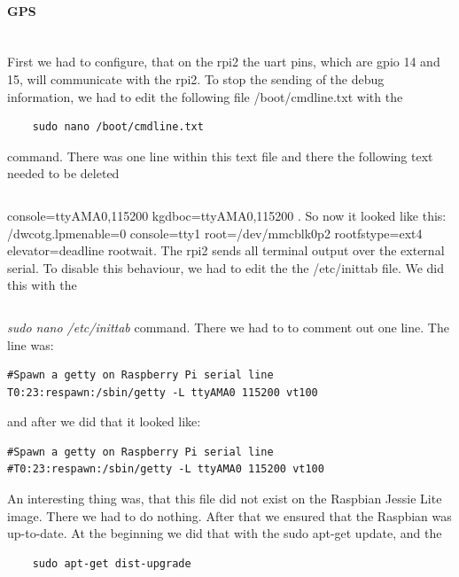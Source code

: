 \paragraph{GPS} \mbox{}\\
First we had to configure, that on the \gls{rpi2} the \gls{uart} pins, which are \gls{gpio} 14 and 15, will communicate with the \gls{rpi2}.\newline
To stop the sending of the debug information, we had to edit the following file /boot/cmdline.txt with the 
\begin{verbatim}
	sudo nano /boot/cmdline.txt
\end{verbatim}
command.\newline
There was one line within this text file and there the following text needed to be deleted
\begin{verbatim}

\end{verbatim}
console=ttyAMA0,115200 kgdboc=ttyAMA0,115200
 .\newline
So now it looked like this: /dwc\textunderscore otg.lpm\textunderscore enable=0 console=tty1 root=/dev/mmcblk0p2 rootfstype=ext4 elevator=deadline rootwait.\newline
The \gls{rpi2} sends all terminal output over the external serial. To disable this behaviour, we had to edit the the /etc/inittab file. We did this with the 
\begin{verbatim}

\end{verbatim}
\textit{sudo nano /etc/inittab} command.\newline
There we had to to comment out one line. The line was:
\begin{verbatim}
#Spawn a getty on Raspberry Pi serial line
T0:23:respawn:/sbin/getty -L ttyAMA0 115200 vt100
\end{verbatim}
and after we did that it looked like:
\begin{verbatim}
#Spawn a getty on Raspberry Pi serial line
#T0:23:respawn:/sbin/getty -L ttyAMA0 115200 vt100
\end{verbatim}
An interesting thing was, that this file did not exist on the Raspbian Jessie Lite image. There we had to do nothing.\newline
After that we ensured that the Raspbian was up-to-date. At the beginning we did that with the sudo apt-get update, and the 
\begin{verbatim}
	sudo apt-get dist-upgrade
\end{verbatim}
